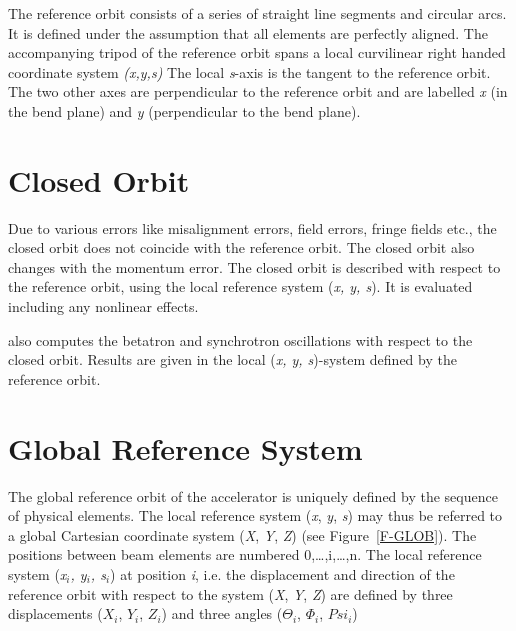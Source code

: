 The reference orbit consists of a series of straight line segments and
circular arcs. It is defined under the assumption that all elements are
perfectly aligned. The accompanying tripod of the reference orbit spans
a local curvilinear right handed coordinate system \textit{(x,y,s)} The
local \textit{s}-axis is the tangent to the reference orbit. The two
other axes are perpendicular to the reference orbit and are labelled
\textit{x} (in the bend plane) and \textit{y} (perpendicular to the bend
plane).  


\section{Closed Orbit}
\label{sec:closed_orbit}

Due to various errors like misalignment errors, field errors, fringe
fields etc., the closed orbit does not coincide with the reference
orbit. The closed orbit also changes with the momentum error. 
The closed orbit is described with respect to the reference orbit, using
the local reference system (\textit{x, y, s}). It is evaluated including
any nonlinear effects.  

\madx also computes the betatron and synchrotron oscillations with respect
to the closed orbit. Results are given in the local (\textit{x, y,
  s})-system defined by the reference orbit. 



\section{Global Reference System}
\label{sec:global_ref}

The global reference orbit of the accelerator is
uniquely defined by the sequence of physical elements. The local
reference system (\textit{x}, \textit{y}, \textit{s}) may thus be
referred to a global Cartesian coordinate system (\textit{X},
\textit{Y}, \textit{Z}) (see Figure~\ref{F-GLOB}). 
The positions between beam elements are numbered 0,\ldots,i,\ldots,n. 
The local reference system  (\textit{x$_i$, y$_i$, s$_i$}) at position
\textit{i}, i.e. the displacement and direction of the reference orbit
with respect to the system (\textit{X}, \textit{Y}, \textit{Z}) are
defined by three displacements  ($X_i$, $Y_i$, $Z_i$) and three angles
($\Theta_i$, $\Phi_i$, $Psi_i$) 

